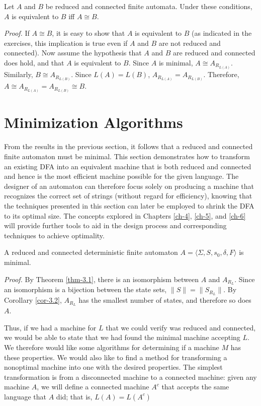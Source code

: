 \begin{cor}\label{cor-3.3}
Let $A$ and $B$ be reduced and connected finite automata. Under these conditions,
$A$ is equivalent to $B$ iff $A \cong B$.

\emph{Proof.} If $A \cong B$, it is easy to show that $A$ is equivalent to $B$
(as indicated in the exercises, this implication is true even if $A$ and $B$ are
not reduced and connected). Now assume the hypothesis that $A$ and $B$ are
reduced and connected does hold, and that $A$ is equivalent to $B$. Since $A$ is
minimal, $A \cong A_{R_{L(A)}}$. Similarly, $B \cong A_{R_{L(B)}}$. Since
$L(A) = L(B)$, $A_{R_{L(A)}} = A_{R_{L(B)}}$. Therefore,
$A \cong A_{R_{L(A)}} = A_{R_{L(B)}} \cong B$.
\end{cor}

\section{Minimization Algorithms}\label{sec-3.2}

From the results in the previous section, it follows that a reduced and
connected finite automaton must be minimal. This section demonstrates how to
transform an existing DFA into an equivalent machine that is both reduced and
connected and hence is the most efficient machine possible for the given
language. The designer of an automaton can therefore focus solely on producing a
machine that recognizes the correct set of strings (without regard for
efficiency), knowing that the techniques presented in this section can later be
employed to shrink the DFA to its optimal size. The concepts explored in
Chapters \ref{ch-4}, \ref{ch-5}, and \ref{ch-6} will provide further tools to
aid in the design process and corresponding techniques to achieve optimality.

\begin{cor}\label{cor-3.4}
A reduced and connected deterministic finite automaton
$A =\langle\Sigma,S,s_0,\delta,F\rangle$ is minimal.

\emph{Proof.} By Theorem \ref{thm-3.1}, there is an isomorphism between $A$ and $A_{R_L}$.
Since an isomorphism is a bijection between the state sets,
$\|S\| = \|S_{R_L}\|$. By Corollary \ref{cor-3.2}, $A_{R_L}$ has the smallest number of
states, and therefore so does $A$.
\end{cor}

Thus, if we had a machine for $L$ that we could verify was reduced and
connected, we would be able to state that we had found the minimal machine
accepting $L$. We therefore would like some algorithms for determining if a
machine $M$ has these properties. We would also like to find a method for
transforming a nonoptimal machine into one with the desired properties. The
simplest transformation is from a disconnected machine to a connected machine:
given any machine $A$, we will define a connected machine $A^c$ that accepts the
same language that $A$ did; that is, $L(A) =L(A^c)$

